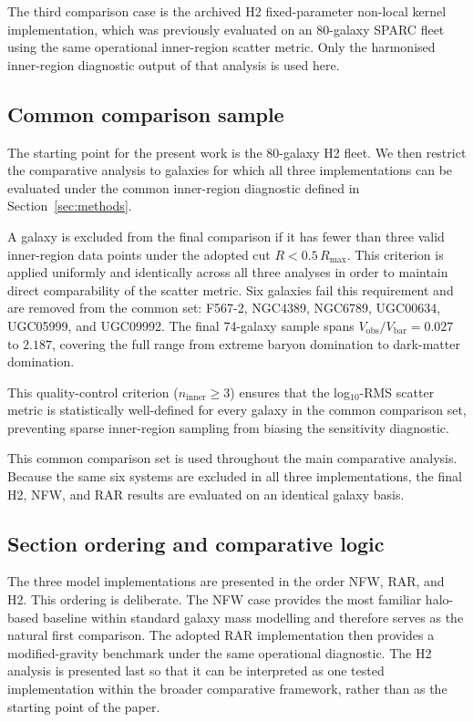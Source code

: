 \documentclass[fleqn,usenatbib]{mnras}
\newcommand{\Vobs}{V_{\mathrm{obs}}}
\newcommand{\Vbar}{V_{\mathrm{bar}}}
\begin{document}
The third comparison case is the archived H2 fixed-parameter non-local
kernel implementation, which was previously evaluated on an 80-galaxy
SPARC fleet using the same operational inner-region scatter metric.
Only the harmonised inner-region diagnostic output of that analysis is
used here.

\subsection{Common comparison sample}
\label{subsec:common_sample}

The starting point for the present work is the 80-galaxy H2 fleet. We
then restrict the comparative analysis to galaxies for which all three
implementations can be evaluated under the common inner-region
diagnostic defined in Section~\ref{sec:methods}.

A galaxy is excluded from the final comparison if it has fewer than
three valid inner-region data points under the adopted cut
$R < 0.5\,R_{\max}$. This criterion is applied uniformly and identically 
across all three analyses in order to maintain direct comparability of 
the scatter metric. Six galaxies fail this requirement and are removed 
from the common set:
F567-2, NGC4389, NGC6789, UGC00634, UGC05999, and UGC09992.
The final 74-galaxy sample spans $\Vobs/\Vbar = 0.027$ to $2.187$, covering the full range from extreme baryon domination to dark-matter domination.

This quality-control criterion ($n_{\mathrm{inner}} \ge 3$) ensures that
the log$_{10}$-RMS scatter metric is statistically well-defined for every
galaxy in the common comparison set, preventing sparse inner-region
sampling from biasing the sensitivity diagnostic.

This common comparison set is used throughout the main comparative
analysis. Because the same six systems are excluded in all three
implementations, the final H2, NFW, and RAR results are evaluated on an
identical galaxy basis.

\subsection{Section ordering and comparative logic}
\label{subsec:section_ordering}

The three model implementations are presented in the order NFW, RAR,
and H2. This ordering is deliberate. The NFW case provides the most
familiar halo-based baseline within standard galaxy mass modelling and
therefore serves as the natural first comparison. The adopted RAR
implementation then provides a modified-gravity benchmark under the
same operational diagnostic. The H2 analysis is presented last so that
it can be interpreted as one tested implementation within the broader
comparative framework, rather than as the starting point of the paper.
\end{document}
